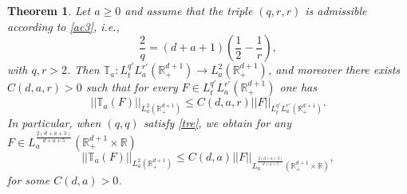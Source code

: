 \documentclass[11pt,letter]{amsart}
\def \RN {\mathbb{R}_+^{d+1}}
\def \R {\mathbb{R}}
\numberwithin{equation}{section}
\newtheorem{theorem}{Theorem}[section]
\numberwithin{equation}{section}
\begin{document}
\begin{theorem}\label{T:resgen}
Let $a\ge 0$ and assume that the triple $(q,r,r)$ is \emph{admissible} according to \eqref{ac3}, i.e.,
\begin{equation}\label{tre}
\frac 2q = (d+a+1)(\frac 12 - \frac 1r),
\end{equation}
with $q, r >2$.
Then  $\mathbb T_a: L^{q'}_t L^{r'}_a(\RN) \to L^2_a(\RN)$, and moreover there exists $C(d,a,r)>0$ such that for every $F\in L^{q'}_t L^{r'}_a(\RN)$ one has
\begin{equation}\label{resgen}
||\mathbb T_a(F)||_{L^2_a(\RN)} \le C(d,a,r) ||F||_{L^{q'}_t L^{r'}_a(\RN)}.
\end{equation} 
In particular, when $(q,q)$ satisfy \eqref{tre}, we obtain for any $F\in L^{\frac{2(d+a+3)}{d+a+5}}_a(\RN\times \R)$
\begin{equation}\label{resgen2}
||\mathbb T_a(F)||_{L^2_a(\RN)} \le C(d,a) ||F||_{L^{\frac{2(d+a+3)}{d+a+5}}_a(\RN\times \R)},
\end{equation} 
for some $C(d,a)>0$.
\end{theorem}
\end{document}
